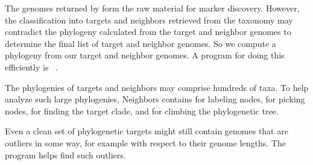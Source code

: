 The genomes returned by  form the raw material for
marker discovery. However, the classification into targets and
neighbors retrieved from the taxonomy may contradict the phylogeny
calculated from the target and neighbor genomes to determine the final
list of target and neighbor genomes. So we compute a phylogeny from
our target and neighbor genomes. A program for doing this efficiently
is ~\cite{klo20:phy}.

The phylogenies of targets and neighbors may comprise hundreds of
taxa. To help analyze such large phylogenies, Neighbors
contains  for labeling nodes,  for picking nodes,
 for finding the target clade, and  for climbing
the phylogenetic tree.

Even a clean set of phylogenetic targets might still contain genomes
that are outliers in some way, for example with respect to their
genome lengths. The program  helps find such
outliers.
